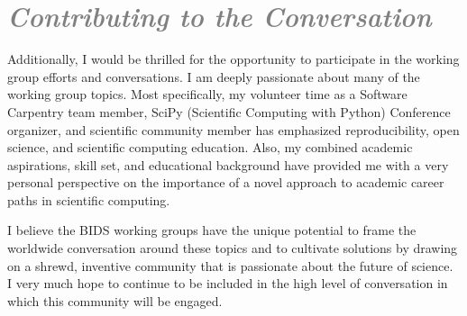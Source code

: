 \documentclass[a4paper, 12pt]{article}
\begin{document}
\section*{\textcolor{gray}{\it Contributing to the Conversation}}

Additionally, I would be thrilled for the opportunity to participate in the 
working group efforts and conversations. I am deeply passionate about many of 
the working group topics. Most specifically, my volunteer time as a Software 
Carpentry team member, SciPy (Scientific Computing with Python) Conference 
organizer, and scientific community member has emphasized reproducibility, open 
science, and scientific computing education. Also, my combined academic 
aspirations, skill set, and educational background have provided me with a very 
personal perspective on the importance of a novel approach to academic career 
paths in scientific computing.

I believe the BIDS working groups have the unique potential to frame the 
worldwide conversation around these topics and to cultivate solutions by drawing 
on a shrewd, inventive community that is passionate about the future of science.  
I very much hope to continue to be included in the high level of conversation in 
which this community will be engaged.



\end{document}
